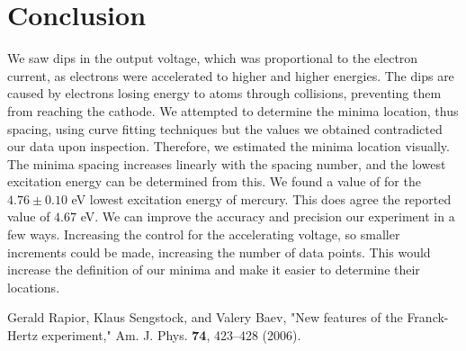 \documentclass[prb,preprint]{revtex4-1}
\begin{document}
\section{Conclusion}
We saw dips in the output voltage, which was proportional to the electron current, as electrons were accelerated to higher and higher energies. The dips are caused by electrons losing energy to atoms through collisions, preventing them from reaching the cathode. 
We attempted to determine the minima location, thus spacing, using curve fitting techniques but the values we obtained contradicted our data upon inspection. Therefore, we estimated the minima location visually. The minima spacing increases linearly with the spacing number, and the lowest excitation energy can be determined from this. We found a value of for the  $4.76 \pm 0.10$ eV lowest excitation energy of mercury. This does agree the reported value of $4.67$ eV.
We can improve the accuracy and precision our experiment in a few ways. Increasing the control for the accelerating voltage, so smaller increments could be made, increasing the number of data points. This would increase the definition of our minima and make it easier to determine their locations. 

\begin{thebibliography}{3}

 Gerald Rapior, Klaus Sengstock, and Valery Baev, "New features of the Franck-Hertz experiment," Am. J. Phys. {\bf 74}, 423--428 (2006).

\end{thebibliography}
\end{document}
